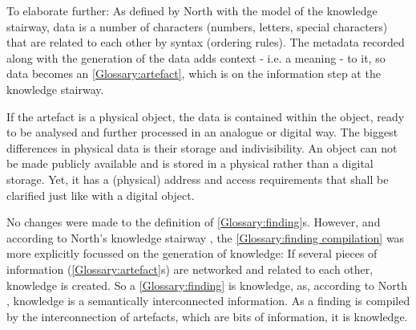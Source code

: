\documentclass{bausteinefdm}
\begin{document}

To elaborate further: As defined by North \cite{North.2021} with the model of the knowledge stairway, data is a number of characters (numbers, letters, special characters) that are related to each other by syntax (ordering rules). 
The metadata recorded along with the generation of the data adds context - i.e. a meaning - to it, so data becomes an \ref{Glossary:artefact}, which is on the information step at the knowledge stairway. %

If the artefact is a physical object, the data is contained within the object, ready to be analysed and further processed in an analogue or digital way. \cite{Rixen.2026, Plomp.2021, Schilthuizen.2015}
The biggest differences in physical data is their storage and indivisibility.
An object can not be made publicly available and is stored in a physical rather than a digital storage.
Yet, it has a (physical) address and access requirements that shall be clarified just like with a digital object.



No changes were made to the definition of \ref{Glossary:finding}s.
However, and according to North's knowledge stairway \cite{North.2021}, the \ref{Glossary:finding compilation} was more explicitly focussed on the generation of knowledge: If several pieces of information (\ref{Glossary:artefact}s) are networked and related to each other, knowledge is created. So a \ref{Glossary:finding} is knowledge, as, according to North \cite{North.2021}, knowledge is a semantically interconnected information.
As a finding is compiled by the interconnection of artefacts, which are bits of information, it is knowledge.
\end{document}
